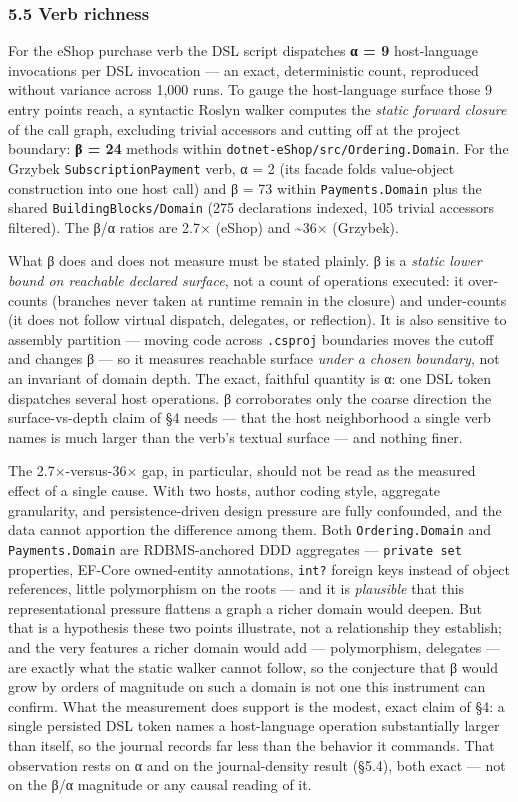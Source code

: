\documentclass[
]{article}
\let\origtexttt\texttt%
\renewcommand{\texttt}[1]{\origtexttt{\seqsplit{#1}}}%
\let\texttt\origtexttt%
\begin{document}
\subsubsection{5.5 Verb richness}\label{verb-richness}

For the eShop purchase verb the DSL script dispatches \textbf{α = 9}
host-language invocations per DSL invocation --- an exact, deterministic
count, reproduced without variance across 1,000 runs. To gauge the
host-language surface those 9 entry points reach, a syntactic Roslyn
walker computes the \emph{static forward closure} of the call graph,
excluding trivial accessors and cutting off at the project boundary:
\textbf{β = 24} methods within
\texttt{dotnet-eShop/src/Ordering.Domain}. For the Grzybek
\texttt{SubscriptionPayment} verb, α = 2 (its facade folds value-object
construction into one host call) and β = 73 within
\texttt{Payments.Domain} plus the shared \texttt{BuildingBlocks/Domain}
(275 declarations indexed, 105 trivial accessors filtered). The β/α
ratios are 2.7× (eShop) and \textasciitilde36× (Grzybek).

What β does and does not measure must be stated plainly. β is a
\emph{static lower bound on reachable declared surface}, not a count of
operations executed: it over-counts (branches never taken at runtime
remain in the closure) and under-counts (it does not follow virtual
dispatch, delegates, or reflection). It is also sensitive to assembly
partition --- moving code across \texttt{.csproj} boundaries moves the
cutoff and changes β --- so it measures reachable surface \emph{under a
chosen boundary}, not an invariant of domain depth. The exact, faithful
quantity is α: one DSL token dispatches several host operations. β
corroborates only the coarse direction the surface-vs-depth claim of §4
needs --- that the host neighborhood a single verb names is much larger
than the verb's textual surface --- and nothing finer.

The 2.7×-versus-36× gap, in particular, should not be read as the
measured effect of a single cause. With two hosts, author coding style,
aggregate granularity, and persistence-driven design pressure are fully
confounded, and the data cannot apportion the difference among them.
Both \texttt{Ordering.Domain} and \texttt{Payments.Domain} are
RDBMS-anchored DDD aggregates --- \texttt{private\ set} properties,
EF-Core owned-entity annotations, \texttt{int?} foreign keys instead of
object references, little polymorphism on the roots --- and it is
\emph{plausible} that this representational pressure flattens a graph a
richer domain would deepen. But that is a hypothesis these two points
illustrate, not a relationship they establish; and the very features a
richer domain would add --- polymorphism, delegates --- are exactly what
the static walker cannot follow, so the conjecture that β would grow by
orders of magnitude on such a domain is not one this instrument can
confirm. What the measurement does support is the modest, exact claim of
§4: a single persisted DSL token names a host-language operation
substantially larger than itself, so the journal records far less than
the behavior it commands. That observation rests on α and on the
journal-density result (§5.4), both exact --- not on the β/α magnitude
or any causal reading of it.
\end{document}
